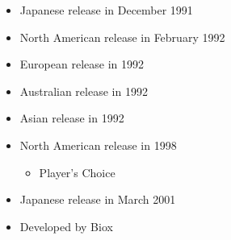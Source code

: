 \documentclass{book}
\begin{document}
\begin{itemize} [nosep]




\item Japanese release in December 1991







\item North American release in February 1992







\item European release in 1992







\item Australian release in 1992







\item Asian release in 1992







\item North American release in 1998
\begin{itemize} [nosep]\item Player’s Choice\end{itemize}\noindent






\item Japanese release in March 2001
































\item Developed by Biox

\end{itemize}\noindent
\end{document}
